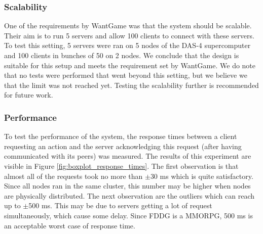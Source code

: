	\subsubsection{Scalability}
	\label{subsubsec:scalability} 
		One of the requirements by WantGame was that the system should be scalable. Their aim is to run 5 servers and allow 100 clients to connect with these servers.
		To test this setting, 5 servers were ran on 5 nodes of the DAS-4 supercomputer and 100 clients in bunches of 50 on 2 nodes. We conclude that the design is suitable for this setup and meets the requirement set by WantGame.
		We do note that no tests were performed that went beyond this setting, but we believe we that the limit was not reached yet. Testing the scalability further is recommended for future work.
		
	\subsubsection{Performance}
	\label{subsubsec:performance}
		To test the performance of the system, the response times between a client requesting an action and the server acknowledging this request (after having communicated with its peers) was measured. 
		The results of this experiment are visible in Figure \ref{fig:boxplot_response_times}.
		The first observation is that almost all of the requests took no more than $\pm$30 ms which is quite satisfactory. Since all nodes ran in the same cluster, this number may be higher when nodes are physically distributed.
		The next observation are the outliers which can reach up to $\pm$500 ms. 
		This may be due to servers getting a lot of request simultaneously, which cause some delay.
		Since FDDG is a MMORPG, 500 ms is an acceptable worst case of response time.
		
